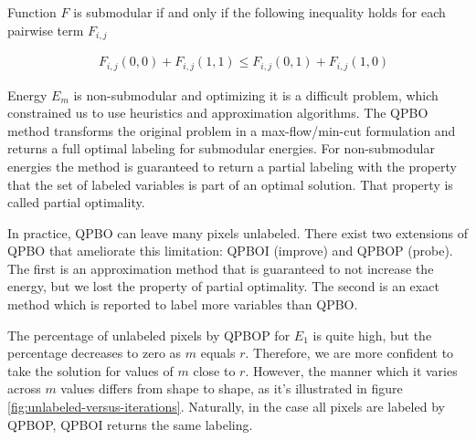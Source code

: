 \documentclass[runningheads]{llncs}
\begin{document}
Function $F$ is submodular if and only if the following inequality holds for each pairwise term $F_{i,j}$ \cite{kolmogorov04whatenergies}

\begin{align*}
	\quad F_{i,j}(0,0) + F_{i,j}(1,1) \leq F_{i,j}(0,1) + F_{i,j}(1,0)
\end{align*}

Energy $E_m$ is non-submodular and optimizing it is a difficult problem, which
constrained us to use heuristics and approximation algorithms. The QPBO method \cite{rother07qpbo} transforms the 
original problem in a max-flow/min-cut formulation and returns a full optimal labeling for submodular energies. For
non-submodular energies the method is guaranteed to return a partial labeling with the property that the set of labeled
variables is part of an optimal solution. That property is called partial optimality.

In practice, QPBO can leave many pixels unlabeled. There exist two extensions of QPBO that ameliorate this limitation: QPBOI
(improve) and QPBOP (probe). The first is an approximation method that is guaranteed to not increase the energy, but we
lost the property of partial optimality. The second is an exact method which is reported to label more variables than
QPBO. 

The percentage of unlabeled pixels by QPBOP for $E_1$ is quite high, but the percentage decreases to zero as $m$ equals $r$. Therefore, we are more confident to take the solution for values of $m$ close to $r$. However, the manner which it varies across $m$ values differs from shape to shape, as it's illustrated in figure \ref{fig:unlabeled-versus-iterations}. Naturally, in the case all pixels are labeled by QPBOP, QPBOI returns the same labeling. 
\end{document}
